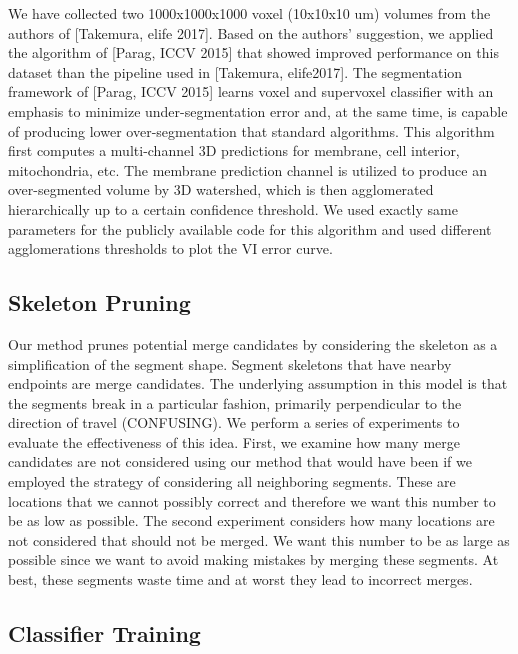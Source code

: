 We have collected two 1000x1000x1000 voxel (10x10x10 um) volumes from the authors of [Takemura, elife 2017]. 
Based on the authors' suggestion, we applied the algorithm of [Parag, ICCV 2015] that showed improved performance on this dataset than the pipeline used in [Takemura, elife2017]. 
The segmentation framework of [Parag, ICCV 2015] learns voxel and supervoxel classifier with an emphasis to minimize under-segmentation error and, at the same time, is capable of producing lower over-segmentation that standard algorithms. 
This algorithm first computes a multi-channel 3D predictions for membrane, cell interior, mitochondria, etc. 
The membrane prediction channel is utilized to produce an over-segmented volume by 3D watershed, which is then agglomerated hierarchically up to a certain confidence threshold. 
We used exactly same parameters for the publicly available code for this algorithm and used different agglomerations thresholds to plot the VI error curve.      

\subsection{Skeleton Pruning}

Our method prunes potential merge candidates by considering the skeleton as a simplification of the segment shape. Segment skeletons that have nearby endpoints are merge candidates. The underlying assumption in this model is that the segments break in a particular fashion, primarily perpendicular to the direction of travel (CONFUSING). We perform a series of experiments to evaluate the effectiveness of this idea. First, we examine how many merge candidates are not considered using our method that would have been if we employed the strategy of considering all neighboring segments. These are locations that we cannot possibly correct and therefore we want this number to be as low as possible. The second experiment considers how many locations are not considered that should not be merged. We want this number to be as large as possible since we want to avoid making mistakes by merging these segments. At best, these segments waste time and at worst they lead to incorrect merges. %
\subsection{Classifier Training}

